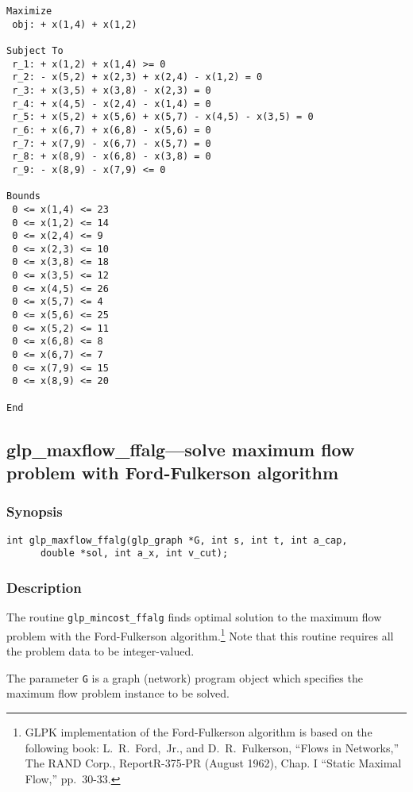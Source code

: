 \begin{verbatim}
Maximize
 obj: + x(1,4) + x(1,2)

Subject To
 r_1: + x(1,2) + x(1,4) >= 0
 r_2: - x(5,2) + x(2,3) + x(2,4) - x(1,2) = 0
 r_3: + x(3,5) + x(3,8) - x(2,3) = 0
 r_4: + x(4,5) - x(2,4) - x(1,4) = 0
 r_5: + x(5,2) + x(5,6) + x(5,7) - x(4,5) - x(3,5) = 0
 r_6: + x(6,7) + x(6,8) - x(5,6) = 0
 r_7: + x(7,9) - x(6,7) - x(5,7) = 0
 r_8: + x(8,9) - x(6,8) - x(3,8) = 0
 r_9: - x(8,9) - x(7,9) <= 0

Bounds
 0 <= x(1,4) <= 23
 0 <= x(1,2) <= 14
 0 <= x(2,4) <= 9
 0 <= x(2,3) <= 10
 0 <= x(3,8) <= 18
 0 <= x(3,5) <= 12
 0 <= x(4,5) <= 26
 0 <= x(5,7) <= 4
 0 <= x(5,6) <= 25
 0 <= x(5,2) <= 11
 0 <= x(6,8) <= 8
 0 <= x(6,7) <= 7
 0 <= x(7,9) <= 15
 0 <= x(8,9) <= 20

End
\end{verbatim}

\newpage

\subsection{glp\_maxflow\_ffalg---solve maximum flow problem with
Ford-Fulkerson algorithm}

\subsubsection*{Synopsis}

\begin{verbatim}
int glp_maxflow_ffalg(glp_graph *G, int s, int t, int a_cap,
      double *sol, int a_x, int v_cut);
\end{verbatim}

\subsubsection*{Description}

The routine \verb|glp_mincost_ffalg| finds optimal solution to the
maximum flow problem with the Ford-Fulkerson algorithm.\footnote{GLPK
implementation of the Ford-Fulkerson algorithm is based on the following
book: L.~R.~Ford,~Jr., and D.~R.~Fulkerson, ``Flows in Networks,'' The
RAND Corp., Report\linebreak R-375-PR (August 1962), Chap. I
``Static Maximal Flow,'' pp.~30-33.} Note that this routine requires all
the problem data to be integer-valued.

The parameter \verb|G| is a graph (network) program object which
specifies the maximum flow problem instance to be solved.

